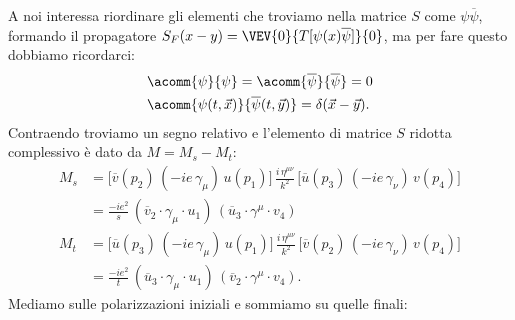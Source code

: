 A noi interessa riordinare gli elementi che troviamo nella matrice $S$ come $\psi\overline{\psi}$, formando il propagatore $S_F(x-y) = \VEV{0}{T[\psi(x) \overline{\psi}]}{0}$, ma per fare questo dobbiamo ricordarci:
\begin{align}
    &\acomm{\psi}{\psi} = \acomm{\overline{\psi}}{\overline{\psi}} = 0 \\
    &\acomm{\psi(t,\vec{x})}{\overline{\psi}(t,\vec{y})} = \delta(\vec{x} - \vec{y}).
\end{align}
Contraendo troviamo un segno relativo e l'elemento di matrice $S$ ridotta complessivo è dato da $M=M_s - M_t$:
\begin{align}
    M_s &= \Big[ \overline{v}(p_2)\, (-ie\, \gamma_\mu)\, u(p_1) \Big]\, \frac{i\, \eta^{\mu\nu}}{k^2}\, \Big[ \overline{u}(p_3)\, (-ie\, \gamma_\nu)\, v(p_4) \Big] \\
    &= \frac{-ie^2}{s}\, (\overline{v}_2\cdot\gamma_\mu\cdot u_1)\, (\overline{u}_3\cdot\gamma^\mu\cdot v_4) \\
    M_t &= \Big[ \overline{u}(p_3)\, (-ie\, \gamma_\mu)\, u(p_1) \Big]\, \frac{i\, \eta^{\mu\nu}}{k^2}\, \Big[ \overline{v}(p_2)\, (-ie\, \gamma_\nu)\, v(p_4) \Big] \\
    &= \frac{-ie^2}{t}\, (\overline{u}_3\cdot\gamma_\mu\cdot u_1)\, (\overline{v}_2\cdot\gamma^\mu\cdot v_4).
\end{align}
Mediamo sulle polarizzazioni iniziali e sommiamo su quelle finali:
